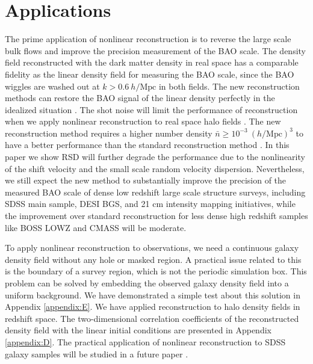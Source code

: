 \documentclass[aps,prx,twocolumn,superscriptaddress,groupedaddress,nofootinbib,amsfont]{revtex4}  %
\newcommand{\mr}{\mathrm}
\begin{document}
\section{Applications}
\label{sec:app}

The prime application of nonlinear reconstruction is to reverse the large scale
bulk flows and improve the precision measurement of the BAO scale. 
The density field reconstructed with the dark matter density in real space has
a comparable fidelity as the linear density field for measuring the BAO scale,
since the BAO wiggles are washed out at $k>0.6\ h/\mr{Mpc}$ in both fields.
The new reconstruction methods can restore the BAO signal of the linear density
perfectly in the idealized situation \cite{2017Marcel,2017Wang}.
The shot noise will limit the performance of reconstruction when we apply 
nonlinear reconstruction to real space halo fields \cite{2017Yu}.
The new reconstruction method requires a higher number density
$\bar{n}\geq10^{-3}\ (h/\mr{Mpc})^3$ to have a better performance than the 
standard reconstruction method \cite{2017Yu}.
In this paper we show RSD will further degrade the performance due to the nonlinearity of the shift velocity and the small scale random velocity dispersion.
Nevertheless, we still expect the new method to substantially improve the 
precision of the measured BAO scale of dense low redshift large scale 
structure surveys, including SDSS main sample, DESI BGS, and 21 cm intensity
mapping initiatives, while the improvement over standard reconstruction for
less dense high redshift samples like BOSS LOWZ and CMASS will be moderate.

To apply nonlinear reconstruction to observations, we need a continuous galaxy
density field without any hole or masked region. A practical issue related to 
this is the boundary of a survey region, which is not the periodic simulation 
box. This problem can be solved by embedding the observed galaxy density field 
into a uniform background. We have demonstrated a simple test about this 
solution in Appendix \ref{appendix:E}. 
We have applied reconstruction to halo density fields in redshift space. 
The two-dimensional correlation coefficients of the reconstructed density field
with the linear initial conditions are presented in Appendix \ref{appendix:D}.
The practical application of nonlinear reconstruction to SDSS galaxy samples 
will be studied in a future paper \cite{2017Zhu}.
\end{document}
